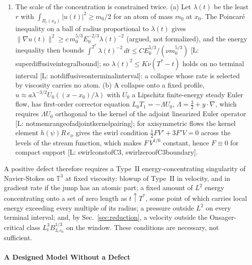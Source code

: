 \documentclass[letterpaper,twocolumn]{article}
\newcommand{\lean}[1]{{\footnotesize\def\_{\textunderscore\allowbreak}%
\hspace{0pt}[L: {\ttfamily\fontdimen3\font=2pt\fontdimen4\font=1pt #1}]}}
\newcommand{\T}{\mathbb{T}}
\begin{document}
\begin{enumerate}
\cite{Hua26}. Since $u \in L^4_tL^4_x$ implies $p \in L^2_{t,x}$, this
moves the exit from $L^4_tL^4_x$ \cite{Lio60,Shi74} to the pressure;
dimensionally it is the same condition.
\item The scale of the concentration is constrained twice. (a) Let
$\lambda(t)$ be the least $r$ with $\int_{B_r(x_0)}|u(t)|^2 \geq m_0/2$
for an atom of mass $m_0$ at $x_0$. The Poincar\'e inequality on a ball
of radius proportional to $\lambda(t)$ gives $\|\nabla u(t)\|^2 \geq c\,
m_0^{5/3} E_0^{-2/3} \lambda(t)^{-2}$ (argued, not formalized), and the
energy inequality then bounds $\int^{T^*} \lambda(t)^{-2}\,dt \leq C
E_0^{5/3}/(\nu m_0^{5/3})$ \lean{superdiffusive\_integral\_bound}; so
$\lambda(t)^2 \leq K\nu(T^*-t)$ holds on no terminal interval
\lean{not\_diffusive\_on\_terminal\_interval}: a collapse whose rate is
selected by viscosity carries no atom. (b) A collapse onto a fixed
profile, $u \approx a\lambda^{-3/2} U_0((x-x_0)/\lambda)$ with $U_0$ a
Lipschitz finite-energy steady Euler flow, has first-order corrector
equation $L_0 T_1 = -\Lambda U_0$, $\Lambda = \tfrac32 + y\cdot\nabla$,
which requires $\Lambda U_0$ orthogonal to the kernel of the adjoint
linearized Euler operator
\lean{not\_mem\_range\_of\_adjoint\_kernel\_pairing}; for axisymmetric
flows the kernel element $h(\psi)R\,e_\phi$ gives the swirl condition
$\tfrac12 F V' + 3F'V = 0$ across the levels of the stream function,
which makes $F\,V^{1/6}$ constant, hence $F \equiv 0$ for compact support
\lean{swirl\_const\_of\_C3, swirl\_zero\_of\_C3\_boundary}.
\end{enumerate}

A positive defect therefore requires a Type~II energy-concentrating
singularity of Navier-Stokes on $\T^3$ at fixed viscosity: blowup of
Type~II in velocity, and in gradient rate if the jump has an atomic part;
a fixed amount of $L^2$ energy concentrating onto a set of zero length as
$t \uparrow T^*$, some point of which carries local energy exceeding every
multiple of its radius; a pressure outside $L^2$ on every terminal
interval; and, by Sec.~\ref{sec:reduction}, a velocity outside the
Onsager-critical class $L^3_t B^{1/3}_{3,c_0}$ on the window. These
conditions are necessary, not sufficient.

\paragraph*{A Designed Model Without a Defect}
\end{document}
